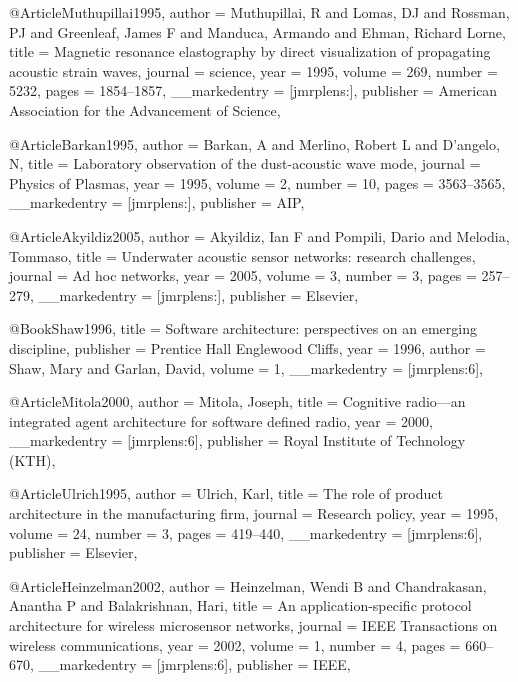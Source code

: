 {{{@Article{Muthupillai1995,
  author        = {Muthupillai, R and Lomas, DJ and Rossman, PJ and Greenleaf, James F and Manduca, Armando and Ehman, Richard Lorne},
  title         = {Magnetic resonance elastography by direct visualization of propagating acoustic strain waves},
  journal       = {science},
  year          = {1995},
  volume        = {269},
  number        = {5232},
  pages         = {1854--1857},
  __markedentry = {[jmrplens:]},
  publisher     = {American Association for the Advancement of Science},
}

@Article{Barkan1995,
  author        = {Barkan, A and Merlino, Robert L and D’angelo, N},
  title         = {Laboratory observation of the dust-acoustic wave mode},
  journal       = {Physics of Plasmas},
  year          = {1995},
  volume        = {2},
  number        = {10},
  pages         = {3563--3565},
  __markedentry = {[jmrplens:]},
  publisher     = {AIP},
}

@Article{Akyildiz2005,
  author        = {Akyildiz, Ian F and Pompili, Dario and Melodia, Tommaso},
  title         = {Underwater acoustic sensor networks: research challenges},
  journal       = {Ad hoc networks},
  year          = {2005},
  volume        = {3},
  number        = {3},
  pages         = {257--279},
  __markedentry = {[jmrplens:]},
  publisher     = {Elsevier},
}

@Book{Shaw1996,
  title         = {Software architecture: perspectives on an emerging discipline},
  publisher     = {Prentice Hall Englewood Cliffs},
  year          = {1996},
  author        = {Shaw, Mary and Garlan, David},
  volume        = {1},
  __markedentry = {[jmrplens:6]},
}

@Article{Mitola2000,
  author        = {Mitola, Joseph},
  title         = {Cognitive radio---an integrated agent architecture for software defined radio},
  year          = {2000},
  __markedentry = {[jmrplens:6]},
  publisher     = {Royal Institute of Technology (KTH)},
}

@Article{Ulrich1995,
  author        = {Ulrich, Karl},
  title         = {The role of product architecture in the manufacturing firm},
  journal       = {Research policy},
  year          = {1995},
  volume        = {24},
  number        = {3},
  pages         = {419--440},
  __markedentry = {[jmrplens:6]},
  publisher     = {Elsevier},
}

@Article{Heinzelman2002,
  author        = {Heinzelman, Wendi B and Chandrakasan, Anantha P and Balakrishnan, Hari},
  title         = {An application-specific protocol architecture for wireless microsensor networks},
  journal       = {IEEE Transactions on wireless communications},
  year          = {2002},
  volume        = {1},
  number        = {4},
  pages         = {660--670},
  __markedentry = {[jmrplens:6]},
  publisher     = {IEEE},
}

}}}
